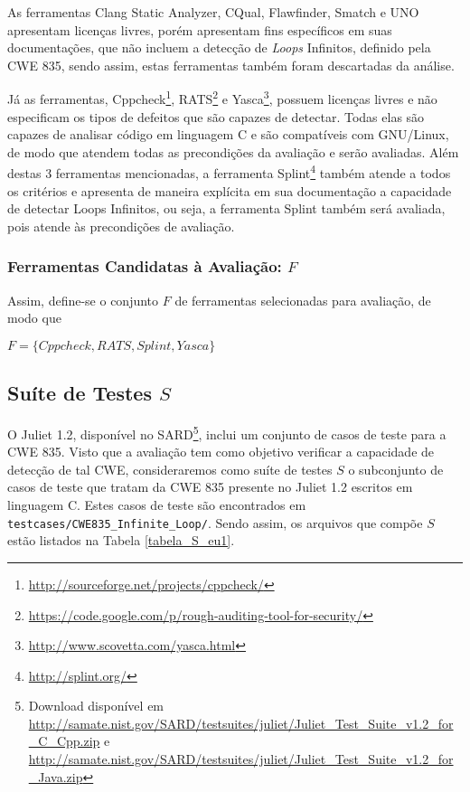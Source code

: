 As ferramentas Clang Static Analyzer, CQual, Flawfinder, Smatch e UNO apresentam licenças livres, porém apresentam fins específicos em suas documentações, que não incluem a detecção de \textit{Loops} Infinitos, definido pela CWE 835, sendo assim, estas ferramentas também foram descartadas da análise.

Já as ferramentas, Cppcheck\footnote{\url{http://sourceforge.net/projects/cppcheck/}}, RATS\footnote{\url{https://code.google.com/p/rough-auditing-tool-for-security/}} e Yasca\footnote{\url{http://www.scovetta.com/yasca.html}}, possuem licenças livres e não especificam os tipos de defeitos que são capazes de detectar. Todas elas são capazes de analisar código em linguagem C e são compatíveis com GNU/Linux, de modo que atendem todas as precondições da avaliação e serão avaliadas. Além destas 3 ferramentas mencionadas, a ferramenta Splint\footnote{\url{http://splint.org/}} também atende a todos os critérios e apresenta de maneira explícita em sua documentação a capacidade de detectar Loops Infinitos, ou seja, a ferramenta Splint também será avaliada, pois atende às precondições de avaliação.

\subsubsection{Ferramentas Candidatas à Avaliação: $F$}

Assim, define-se o conjunto $F$ de ferramentas selecionadas para avaliação, de modo que

$F = \lbrace Cppcheck, RATS, Splint, Yasca\rbrace$

\subsection{Suíte de Testes $S$}

O Juliet 1.2, disponível no SARD\footnote{Download disponível em \url{http://samate.nist.gov/SARD/testsuites/juliet/Juliet_Test_Suite_v1.2_for_C_Cpp.zip} e \url{http://samate.nist.gov/SARD/testsuites/juliet/Juliet_Test_Suite_v1.2_for_Java.zip}}, inclui um conjunto de casos de teste para a CWE 835. Visto que a avaliação tem como objetivo verificar a capacidade de detecção de tal CWE, consideraremos como suíte de testes $S$ o subconjunto de casos de teste que tratam da CWE 835 presente no Juliet 1.2 escritos em linguagem C. Estes casos de teste são encontrados em \lstinline{testcases/CWE835_Infinite_Loop/}. Sendo assim, os arquivos que compõe $S$ estão listados na Tabela \ref{tabela_S_eu1}.

